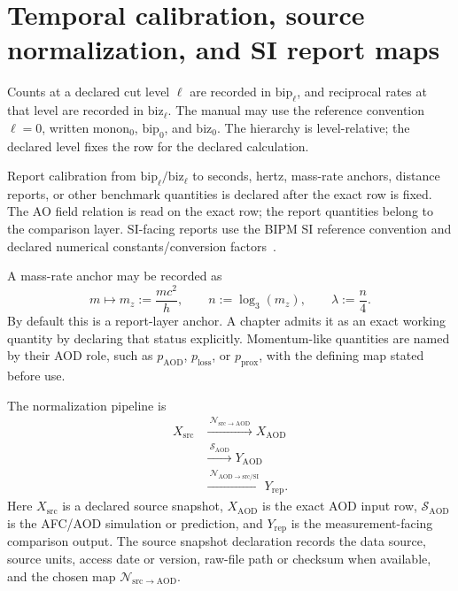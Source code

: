 \section{Temporal calibration, source normalization, and SI report maps}
\label{app:manual-temporal-calibration}

Counts at a declared cut level \(\ell\) are recorded in \(\mathrm{bip}_{\ell}\), and reciprocal rates at that level are recorded in \(\mathrm{biz}_{\ell}\). The manual may use the reference convention \(\ell=0\), written \(\mathrm{monon}_0\), \(\mathrm{bip}_0\), and \(\mathrm{biz}_0\). The hierarchy is level-relative; the declared level fixes the row for the declared calculation.

Report calibration from \(\mathrm{bip}_{\ell}/\mathrm{biz}_{\ell}\) to seconds, hertz, mass-rate anchors, distance reports, or other benchmark quantities is declared after the exact row is fixed. The AO field relation is read on the exact row; the report quantities belong to the comparison layer. SI-facing reports use the BIPM SI reference convention and declared numerical constants/conversion factors~\cite{bipm_si_brochure_2025,nist_constants_complete}.

A mass-rate anchor may be recorded as
\[
m \mapsto m_z := \frac{mc^2}{h},
\qquad
n := \log_3(m_z),
\qquad
\lambda := \frac{n}{4}.
\]
By default this is a report-layer anchor. A chapter admits it as an exact working quantity by declaring that status explicitly. Momentum-like quantities are named by their AOD role, such as \(p_{\mathrm{AOD}}\), \(p_{\mathrm{loss}}\), or \(p_{\mathrm{prox}}\), with the defining map stated before use.

The normalization pipeline is
\[
\begin{aligned}
X_{\mathrm{src}}
&\xrightarrow{\ \mathcal N_{\mathrm{src}\to\mathrm{AOD}}\ }
X_{\mathrm{AOD}}\\
&\xrightarrow{\ \mathcal S_{\mathrm{AOD}}\ }
Y_{\mathrm{AOD}}\\
&\xrightarrow{\ \mathcal N_{\mathrm{AOD}\to\mathrm{src/SI}}\ }
Y_{\mathrm{rep}}.
\end{aligned}
\]
Here \(X_{\mathrm{src}}\) is a declared source snapshot, \(X_{\mathrm{AOD}}\) is the exact AOD input row, \(\mathcal S_{\mathrm{AOD}}\) is the AFC/AOD simulation or prediction, and \(Y_{\mathrm{rep}}\) is the measurement-facing comparison output. The source snapshot declaration records the data source, source units, access date or version, raw-file path or checksum when available, and the chosen map \(\mathcal N_{\mathrm{src}\to\mathrm{AOD}}\).

